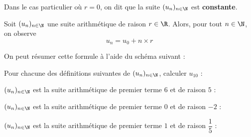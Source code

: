 \documentclass{article}
\begin{document}
\begin{remark}
Dans le cas particulier où $r = 0$, on dit que la suite $(u_n)_{n \in \N}$ est \textbf{constante}.
\end{remark}
\begin{proposition}
Soit $(u_n)_{n \in \N}$ une suite arithmétique de raison $r \in \R$. Alors, pour tout $n \in \N$, on observe
\begin{equation*}
u_n = u_0 + n \times r
\end{equation*}
\end{proposition}
\begin{remark}
On peut résumer cette formule à l'aide du schéma suivant :
\begin{center}
\end{center}
\end{remark}
\begin{example}
Pour chacune des définitions suivantes de $(u_n)_{n \in \N}$, calculer $u_{10}$ :
\begin{enumquestions}
\item $(u_n)_{n \in \N}$ est la suite arithmétique de premier terme $6$ et de raison $5$ : \answersline
\item $(u_n)_{n \in \N}$ est la suite arithmétique de premier terme $0$ et de raison $-2$ : \answersline
\item $(u_n)_{n \in \N}$ est la suite arithmétique de premier terme $1$ et de raison $\dfrac{1}{5}$ : \answersline
\end{enumquestions}
\end{example}
\end{document}
